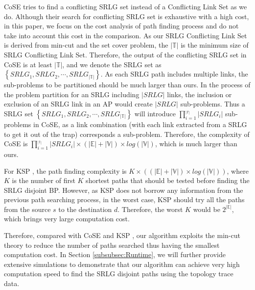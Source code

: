 CoSE tries to find a conflicting SRLG set instead of a Conflicting Link Set as we do. Although their search for conflicting SRLG set is exhaustive with a high cost, in this paper, we focus on the cost analysis of path finding process and do not take into account this cost in the comparison. As our SRLG Conflicting Link Set is derived from min-cut and the set cover problem, the $|\mathbb{T}|$ is the minimum size of SRLG Conflicting Link Set. Therefore, the output of the conflicting SRLG set in CoSE is at least $|\mathbb{T}|$, and we denote the SRLG set as $\left\{ {SRL{G_1},SRL{G_2}, \cdots ,SRL{G_{|\mathbb{T}|}}} \right\}$. As each SRLG path includes multiple links, the sub-problems to be partitioned should be much larger than ours. In the process of the problem partition for an SRLG including  $|SRLG|$ links, the inclusion or exclusion of an SRLG link in an AP would create  $|SRLG|$ sub-problems.  Thus a SRLG set $\left\{ {SRL{G_1},SRL{G_2}, \cdots ,SRL{G_{|\mathbb{T}|}}} \right\}$ will introduce $\prod\limits_{i = 1}^{_{\left| T \right|}} {\left| {SRL{G_i}} \right|}$ sub-problems in CoSE, as a link  combination (with each link extracted from a SRLG to get it out of the trap) corresponds  a sub-problem. Therefore, the complexity of CoSE  is $\prod\limits_{i = 1}^{_{|\mathbb{T}|}} {\left| {SRL{G_i}} \right|}\times (|\mathbb{E}|+|\mathbb{V}|)\times log(|\mathbb{V}|)$, which is much larger than ours.

For KSP \cite{eppstein1998finding}, the path finding complexity is $K\times ((|\mathbb{E}|+|\mathbb{V}|)\times log(|\mathbb{V}|))$, where $K$ is the number of first $K$ shortest paths that should be tested before finding the SRLG disjoint BP. However, as KSP does not borrow any information from the previous path searching process, in the worst case, KSP should try all the paths from the source $s$ to the destination $d$. Therefore, the worst $K$ would be  $2^{|\mathbb{E}|}$, which brings very large computation cost.

Therefore, compared with  CoSE \cite{rostami2007cose} and KSP \cite{eppstein1998finding}, our algorithm exploits the min-cut theory to reduce the number of paths searched thus having the smallest computation cost.  In Section \ref{subsubsec:Runtime}, we will further provide extensive simulations to demonstrate that our algorithm can achieve very high computation speed to find the SRLG disjoint paths using the topology trace data.
